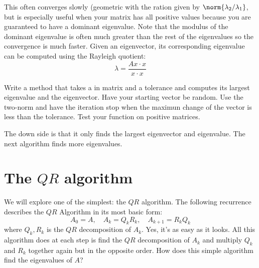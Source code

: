 This often converges slowly (geometric with the ration given by $\norm{\lambda_2/\lambda_1}$, but is especially useful when your matrix has all positive values because you are guaranteed to have a dominant eigenvalue. Note that the modulus of the dominant eigenvalue is often much greater than the rest of the eigenvalues so the convergence is much faster.
Given an eigenvector, its corresponding eigenvalue can be computed using the Rayleigh quotient:
\[
\lambda = \frac{Ax\cdot x}{x\cdot x}
\]
\begin{problem}
Write a method that takes a in matrix and a tolerance and computes its largest eigenvalue and the eigenvector. Have your starting vector be random. Use the two-norm and have the iteration stop when the maximun change of the vector is less than the tolerance. Test your function on positive matrices.
\end{problem}

The down side is that it only finds the largest eigenvector and eigenvalue. The next algorithm finds more eigenvalues.

\section*{The $QR$ algorithm}


We will explore one of the simplest: the $QR$ algorithm.
The following recurrence describes the $QR$ Algorithm in its most basic form:
\begin{equation*}
A_0 = A, \quad A_k = Q_k R_k, \quad A_{k+1} = R_k Q_k
\end{equation*}
where $Q_k, R_k$ is the $QR$ decomposition of $A_k$.
Yes, it's as easy as it looks.
All this algorithm does at each step is find the $QR$ decomposition of $A_k$ and multiply $Q_k$ and $R_k$ together again but in the opposite order.
How does this simple algorithm find the eigenvalues of $A$?

